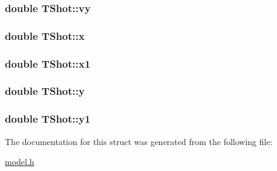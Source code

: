 \subsubsection[{\texorpdfstring{vy}{vy}}]{\setlength{\rightskip}{0pt plus 5cm}double T\+Shot\+::vy}\hypertarget{struct_t_shot_a3ad1d2834c4be13bcdf488ef57de8311}{}\label{struct_t_shot_a3ad1d2834c4be13bcdf488ef57de8311}
\subsubsection[{\texorpdfstring{x}{x}}]{\setlength{\rightskip}{0pt plus 5cm}double T\+Shot\+::x}\hypertarget{struct_t_shot_a20e267b4a3e1f0feca9ff50c6c8dd460}{}\label{struct_t_shot_a20e267b4a3e1f0feca9ff50c6c8dd460}
\subsubsection[{\texorpdfstring{x1}{x1}}]{\setlength{\rightskip}{0pt plus 5cm}double T\+Shot\+::x1}\hypertarget{struct_t_shot_a04c0ba5caa1ea9ab2be4f282d44423bb}{}\label{struct_t_shot_a04c0ba5caa1ea9ab2be4f282d44423bb}
\subsubsection[{\texorpdfstring{y}{y}}]{\setlength{\rightskip}{0pt plus 5cm}double T\+Shot\+::y}\hypertarget{struct_t_shot_a04381372a3ffa1796de43381ab1409f6}{}\label{struct_t_shot_a04381372a3ffa1796de43381ab1409f6}
\subsubsection[{\texorpdfstring{y1}{y1}}]{\setlength{\rightskip}{0pt plus 5cm}double T\+Shot\+::y1}\hypertarget{struct_t_shot_ad00c30f4c3b310313614c3f9690ff3af}{}\label{struct_t_shot_ad00c30f4c3b310313614c3f9690ff3af}


The documentation for this struct was generated from the following file\+:\begin{DoxyCompactItemize}
\item 
\hyperlink{model_8h}{model.\+h}\end{DoxyCompactItemize}
